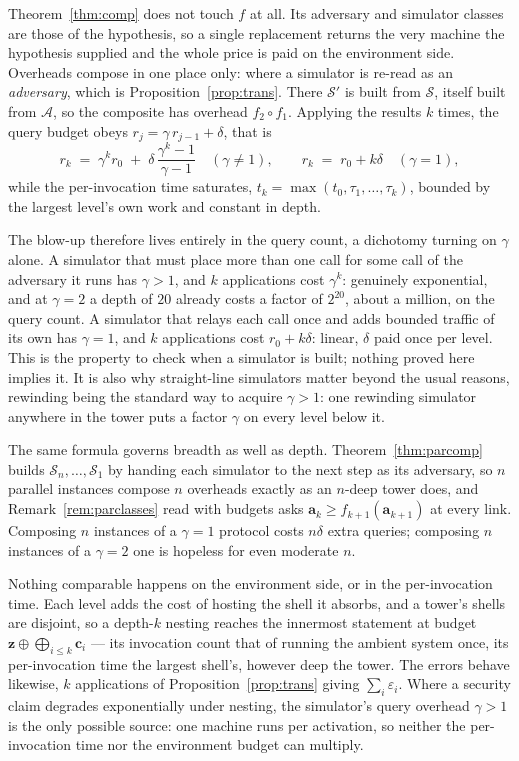 \documentclass[11pt,a4paper]{article}
\newcommand{\Adv}{\mathcal{A}}
\newcommand{\Sim}{\mathcal{S}}
\newcommand{\bd}[1]{\mathbf{#1}}
\theoremstyle{accentdef}
\theoremstyle{accentplain}
\begin{document}
Theorem~\ref{thm:comp} does not touch $f$ at all. Its adversary and simulator classes are those
of the hypothesis, so a single replacement returns the very machine the hypothesis supplied and
the whole price is paid on the environment side. Overheads compose in one place only: where a
simulator is re-read as an \emph{adversary}, which is Proposition~\ref{prop:trans}. There $\Sim'$
is built from $\Sim$, itself built from $\Adv$, so the composite has overhead $f_2 \circ f_1$.
Applying the results $k$ times, the query budget obeys $r_j = \gamma\, r_{j-1} + \delta$, that is
\[
  r_k \;=\; \gamma^{k} r_0 \;+\; \delta\,\frac{\gamma^{k}-1}{\gamma-1}
  \quad (\gamma \neq 1),
  \qquad
  r_k \;=\; r_0 + k\delta \quad (\gamma = 1) ,
\]
while the per-invocation time saturates, $t_k = \max(t_0, \tau_1, \ldots, \tau_k)$, bounded by the
largest level's own work and constant in depth.

The blow-up therefore lives entirely in the query count, a dichotomy turning on $\gamma$ alone. A
simulator that must place more than one call for some call of the adversary it runs has
$\gamma > 1$, and $k$ applications cost $\gamma^k$: genuinely exponential, and at $\gamma = 2$ a
depth of $20$ already costs a factor of $2^{20}$, about a million, on the query count. A simulator
that relays each call once and adds bounded traffic of its own has $\gamma = 1$, and $k$
applications cost $r_0 + k\delta$: linear, $\delta$ paid once per level. This is the property to
check when a simulator is built; nothing proved here implies it. It is also why straight-line
simulators matter beyond the usual reasons, rewinding being the standard way to acquire
$\gamma > 1$: one rewinding simulator anywhere in the tower puts a factor $\gamma$ on every level
below it.

The same formula governs breadth as well as depth. Theorem~\ref{thm:parcomp} builds
$\Sim_n,\ldots,\Sim_1$ by handing each simulator to the next step as its adversary, so $n$
parallel instances compose $n$ overheads exactly as an $n$-deep tower does, and
Remark~\ref{rem:parclasses} read with budgets asks $\bd{a}_k \geq f_{k+1}(\bd{a}_{k+1})$ at every
link. Composing $n$ instances of a $\gamma = 1$ protocol costs $n\delta$ extra queries; composing
$n$ instances of a $\gamma = 2$ one is hopeless for even moderate $n$.

Nothing comparable happens on the environment side, or in the per-invocation time. Each level adds
the cost of hosting the shell it absorbs, and a tower's shells are disjoint, so a depth-$k$ nesting
reaches the innermost statement at budget $\bd{z} \oplus \bigoplus_{i \leq k} \bd{c}_i$ --- its
invocation count that of running the ambient system once, its per-invocation time the largest
shell's, however deep the tower. The errors behave likewise, $k$ applications of
Proposition~\ref{prop:trans} giving $\sum_i \varepsilon_i$. Where a security claim degrades
exponentially under nesting, the simulator's query overhead $\gamma > 1$ is the only possible
source: one machine runs per activation, so neither the per-invocation time nor the environment
budget can multiply.
\end{document}
